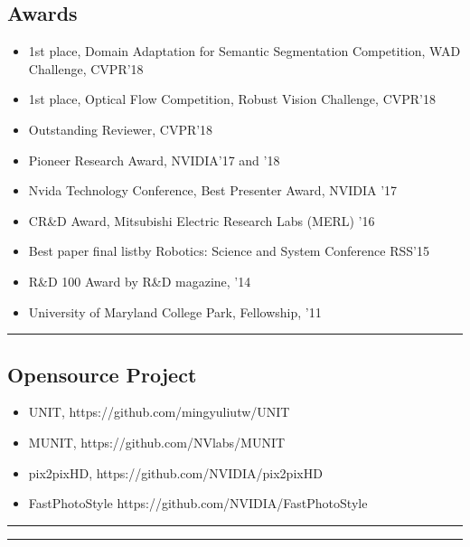 \documentclass[10pt,letterpaper]{article}
\begin{document}
\subsection*{Awards}
\begin{itemize}
\item 1st place, Domain Adaptation for Semantic Segmentation Competition, WAD Challenge, CVPR'18\vspace{-2mm}
\item 1st place, Optical Flow Competition, Robust Vision Challenge, CVPR'18\vspace{-2mm}
\item Outstanding Reviewer, CVPR'18\vspace{-2mm}
\item Pioneer Research Award, NVIDIA'17 and '18\vspace{-2mm}
\item Nvida Technology Conference, Best Presenter Award, NVIDIA '17\vspace{-2mm}
\item CR\&D Award, Mitsubishi Electric Research Labs (MERL) '16\vspace{-2mm}
\item Best paper final listby Robotics: Science and System Conference RSS'15\vspace{-2mm}
\item R\&D 100 Award by R\&D magazine, '14\vspace{-2mm}
\item University of Maryland College Park, Fellowship, '11
\end{itemize}
\hrule
\subsection*{Opensource Project}
\begin{itemize}
	\item UNIT, https://github.com/mingyuliutw/UNIT\vspace{-2mm}
	\item MUNIT, https://github.com/NVlabs/MUNIT\vspace{-2mm}
	\item pix2pixHD, https://github.com/NVIDIA/pix2pixHD\vspace{-2mm}
	\item FastPhotoStyle https://github.com/NVIDIA/FastPhotoStyle\vspace{-2mm}
\end{itemize}
\hrule


\hrule
\end{document}
